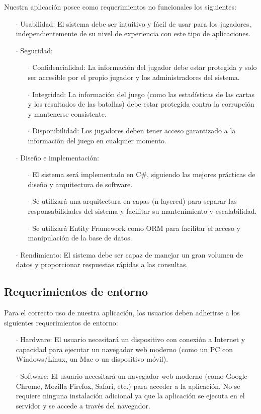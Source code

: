 Nuestra aplicación posee como requerimientos no funcionales los siguientes:

\begin{enumerate}
  \item[\(\cdot\)] Usabilidad: El sistema debe ser intuitivo y fácil de usar para los jugadores, independientemente de su nivel de experiencia con este tipo de aplicaciones.
  \item[\(\cdot\)] Seguridad:
    \begin{enumerate}
      \item[\(\cdot\)] Confidencialidad: La información del jugador debe estar protegida y solo ser accesible por el propio jugador y los administradores del sistema.
      \item[\(\cdot\)] Integridad: La información del juego (como las estadísticas de las cartas y los resultados de las batallas) debe estar protegida contra la corrupción y mantenerse consistente.
      \item[\(\cdot\)] Disponibilidad: Los jugadores deben tener acceso garantizado a la información del juego en cualquier momento.
    \end{enumerate}
  \item[\(\cdot\)] Diseño e implementación:
    \begin{enumerate}
      \item[\(\cdot\)] El sistema será implementado en C\#, siguiendo las mejores prácticas de diseño y arquitectura de software.
      \item[\(\cdot\)] Se utilizará una arquitectura en capas (n-layered) para separar las responsabilidades del sistema y facilitar su mantenimiento y escalabilidad.
      \item[\(\cdot\)] Se utilizará Entity Framework como ORM para facilitar el acceso y manipulación de la base de datos.
    \end{enumerate}
  \item[\(\cdot\)] Rendimiento: El sistema debe ser capaz de manejar un gran volumen de datos y proporcionar respuestas rápidas a las consultas.
\end{enumerate}

\subsection{Requerimientos de entorno}

Para el correcto uso de nuestra aplicación, los usuarios deben adherirse a los siguientes requerimientos de entorno:

\begin{enumerate}
  \item[\(\cdot\)] Hardware: El usuario necesitará un dispositivo con conexión a Internet y capacidad para ejecutar un navegador web moderno (como un PC con Windows/Linux, un Mac o un dispositivo móvil).
  \item[\(\cdot\)] Software: El usuario necesitará un navegador web moderno (como Google Chrome, Mozilla Firefox, Safari, etc.) para acceder a la aplicación. No se requiere ninguna instalación adicional ya que la aplicación se ejecuta en el servidor y se accede a través del navegador.
\end{enumerate}
